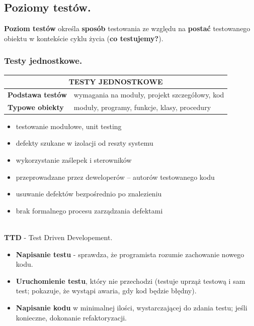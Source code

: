 \documentclass[12pt]{article}
\begin{document}
    \subsection{Poziomy testów.}
    \begin{definition}
        \textbf{Poziom testów} określa \textbf{sposób} testowania ze względu na \textbf{postać}
        testowanego obiektu w kontekście cyklu życia (\textbf{co testujemy?}).
    \end{definition}

    \subsubsection{Testy jednostkowe.}

    \begin{table}[H]
        \begin{center}
            \begin{tabular}{| p{4cm}| p{12cm}|}
                \hline
                \multicolumn{2}{|c|}{ \textbf{TESTY JEDNOSTKOWE}}\\
                \hline
                \textbf{Podstawa testów} & wymagania na moduły, projekt szczegółowy, kod\\
                \hline
                \textbf{Typowe obiekty} & moduły, programy, funkcje, klasy, procedury\\
                \hline
            \end{tabular}
        \end{center}
    \end{table}


    \begin{itemize}
        \item testowanie modułowe, unit testing
        \item defekty szukane w izolacji od reszty systemu
        \item wykorzystanie zaślepek i sterowników
        \item przeprowadzane przez deweloperów – autorów testowanego kodu
        \item usuwanie defektów bezpośrednio po znalezieniu
        \item brak formalnego procesu zarządzania defektami
    \end{itemize}

    \hfill \\

    \noindent \textbf{TTD} - Test Driven Developement.
    \begin{itemize}
        \item \textbf{Napisanie testu} - sprawdza, że programista rozumie zachowanie nowego kodu.
        \item \textbf{Uruchomienie testu}, który nie przechodzi (testuje uprząż testową i sam test; pokazuje,
        że wystąpi awaria, gdy kod będzie błędny).
        \item \textbf{Napisanie kodu} w minimalnej ilości, wystarczającej do zdania testu; jeśli
        konieczne, dokonanie refaktoryzacji.
    \end{itemize}
\end{document}
